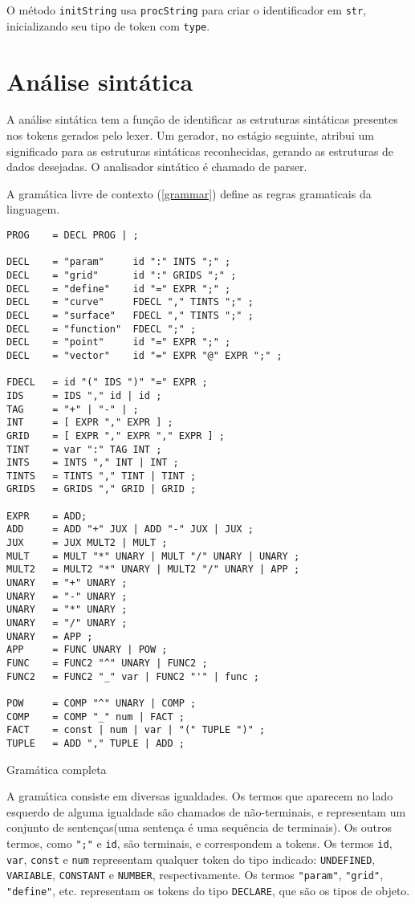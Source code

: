 \documentclass[10pt,a4paper]{article}
\newenvironment{code}{\captionsetup{type=listing}}{}
\begin{document}
O método \texttt{initString} usa \texttt{procString} para criar o identificador em \texttt{str},
inicializando seu tipo de token com \texttt{type}.


\newpage
\section{Análise sintática}
A análise sintática tem a função de identificar as estruturas sintáticas presentes nos tokens gerados pelo lexer.
Um gerador, no estágio seguinte, atribui um significado para as estruturas sintáticas reconhecidas,
gerando as estruturas de dados desejadas. O analisador sintático é chamado de parser.

A gramática livre de contexto (\ref{grammar}) define as regras gramaticais da linguagem.
\begin{code}
\begin{verbatim}
PROG    = DECL PROG | ;

DECL    = "param"     id ":" INTS ";" ;
DECL    = "grid"      id ":" GRIDS ";" ;
DECL    = "define"    id "=" EXPR ";" ;
DECL    = "curve"     FDECL "," TINTS ";" ;
DECL    = "surface"   FDECL "," TINTS ";" ;
DECL    = "function"  FDECL ";" ;
DECL    = "point"     id "=" EXPR ";" ;
DECL    = "vector"    id "=" EXPR "@" EXPR ";" ;

FDECL   = id "(" IDS ")" "=" EXPR ;
IDS     = IDS "," id | id ;
TAG     = "+" | "-" | ;
INT     = [ EXPR "," EXPR ] ;
GRID    = [ EXPR "," EXPR "," EXPR ] ;
TINT    = var ":" TAG INT ;
INTS    = INTS "," INT | INT ;
TINTS   = TINTS "," TINT | TINT ;
GRIDS   = GRIDS "," GRID | GRID ;

EXPR    = ADD;
ADD     = ADD "+" JUX | ADD "-" JUX | JUX ;
JUX     = JUX MULT2 | MULT ;
MULT    = MULT "*" UNARY | MULT "/" UNARY | UNARY ;
MULT2   = MULT2 "*" UNARY | MULT2 "/" UNARY | APP ;
UNARY   = "+" UNARY ;
UNARY   = "-" UNARY ;
UNARY   = "*" UNARY ;
UNARY   = "/" UNARY ;
UNARY   = APP ;
APP     = FUNC UNARY | POW ;
FUNC    = FUNC2 "^" UNARY | FUNC2 ;
FUNC2   = FUNC2 "_" var | FUNC2 "'" | func ;

POW     = COMP "^" UNARY | COMP ;
COMP    = COMP "_" num | FACT ;
FACT    = const | num | var | "(" TUPLE ")" ;
TUPLE   = ADD "," TUPLE | ADD ;
\end{verbatim}
\caption{Gramática completa}
\label{grammar}
\end{code}

A gramática consiste em diversas igualdades.
Os termos que aparecem no lado esquerdo de alguma igualdade são chamados de não-terminais,
e representam um conjunto de sentenças(uma sentença é uma sequência de terminais).
Os outros termos, como \texttt{";"} e \texttt{id}, são terminais,
e correspondem a tokens. Os termos \texttt{id}, \texttt{var}, \texttt{const}
e \texttt{num} representam qualquer token do tipo indicado:
\texttt{UNDEFINED}, \texttt{VARIABLE}, \texttt{CONSTANT} e \texttt{NUMBER}, respectivamente.
Os termos \texttt{"param"}, \texttt{"grid"}, \texttt{"define"}, etc.
representam os tokens do tipo \texttt{DECLARE}, que são os tipos de objeto.
\end{document}
